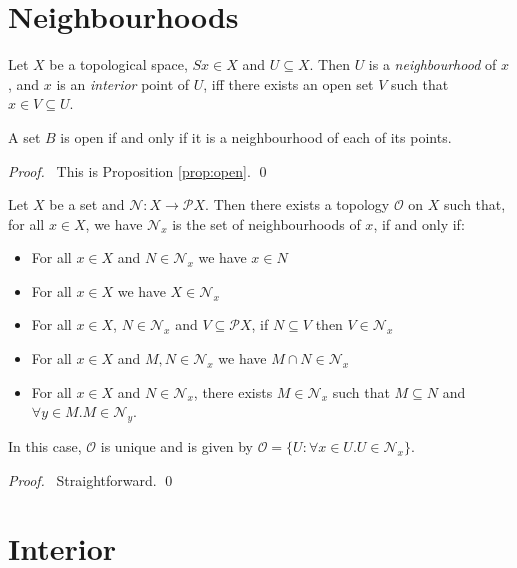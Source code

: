 \section{Neighbourhoods}

\begin{df}[Neighbourhood]
Let $X$ be a topological space, $Sx \in X$ and $U \subseteq X$. Then $U$ is a \emph{neighbourhood} of $x$, and $x$ is an \emph{interior} point of $U$, iff there exists an open set $V$ such that $x \in V \subseteq U$.
\end{df}

\begin{prop}
A set $B$ is open if and only if it is a neighbourhood of each of its points.
\end{prop}

\begin{proof}
	\pf\ This is Proposition \ref{prop:open}. \qed
\end{proof}

\begin{prop}
Let $X$ be a set and $\mathcal{N} : X \rightarrow \mathcal{P} X$. Then there exists a topology $\mathcal{O}$ on $X$ such that, for all $x \in X$, we have $\mathcal{N}_x$ is the set of neighbourhoods of $x$, if and only if:
\begin{itemize}
\item For all $x \in X$ and $N \in \mathcal{N}_x$ we have $x \in N$
\item For all $x \in X$ we have $X \in \mathcal{N}_x$
\item For all $x \in X$, $N \in \mathcal{N}_x$ and $V \subseteq \mathcal{P} X$, if $N \subseteq V$ then $V \in \mathcal{N}_x$
\item For all $x \in X$ and $M, N \in \mathcal{N}_x$ we have $M \cap N \in \mathcal{N}_x$
\item For all $x \in X$ and $N \in \mathcal{N}_x$, there exists $M \in \mathcal{N}_x$ such that $M \subseteq N$ and $\forall y \in M. M \in \mathcal{N}_y$.
\end{itemize}
In this case, $\mathcal{O}$ is unique and is given by $\mathcal{O} = \{ U : \forall x \in U. U \in \mathcal{N}_x \}$.
\end{prop}

\begin{proof}
\pf\ Straightforward. \qed
\end{proof}

\section{Interior}

